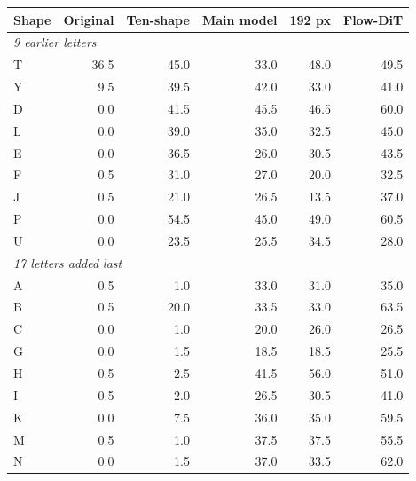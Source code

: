 \begin{tabular}{lrrrrr}
\toprule
Shape & Original & Ten-shape & Main model & 192 px & Flow-DiT \\
\midrule
\multicolumn{6}{l}{\textit{9 earlier letters}} \\
T & 36.5 & 45.0 & 33.0 & 48.0 & 49.5 \\
Y & 9.5 & 39.5 & 42.0 & 33.0 & 41.0 \\
D & 0.0 & 41.5 & 45.5 & 46.5 & 60.0 \\
L & 0.0 & 39.0 & 35.0 & 32.5 & 45.0 \\
E & 0.0 & 36.5 & 26.0 & 30.5 & 43.5 \\
F & 0.5 & 31.0 & 27.0 & 20.0 & 32.5 \\
J & 0.5 & 21.0 & 26.5 & 13.5 & 37.0 \\
P & 0.0 & 54.5 & 45.0 & 49.0 & 60.5 \\
U & 0.0 & 23.5 & 25.5 & 34.5 & 28.0 \\
\midrule
\multicolumn{6}{l}{\textit{17 letters added last}} \\
A & 0.5 & 1.0 & 33.0 & 31.0 & 35.0 \\
B & 0.5 & 20.0 & 33.5 & 33.0 & 63.5 \\
C & 0.0 & 1.0 & 20.0 & 26.0 & 26.5 \\
G & 0.0 & 1.5 & 18.5 & 18.5 & 25.5 \\
H & 0.5 & 2.5 & 41.5 & 56.0 & 51.0 \\
I & 0.5 & 2.0 & 26.5 & 30.5 & 41.0 \\
K & 0.0 & 7.5 & 36.0 & 35.0 & 59.5 \\
M & 0.5 & 1.0 & 37.5 & 37.5 & 55.5 \\
N & 0.0 & 1.5 & 37.0 & 33.5 & 62.0 \\
\bottomrule
\end{tabular}
\hspace{6mm}
